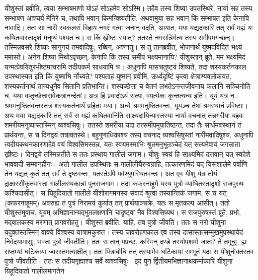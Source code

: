 \vakya यीशुस्तां ब्रवीति, त्वया सम्भाषमाणो योऽहं सोऽहमेव सोऽस्मि।
\vakya तदैव तस्य शिष्या उपतस्थिरे, नार्या सह तस्य सम्भाषण आश्चर्यं मेनिरे च, तथापि भवान् किमन्विष्यतीति, अथवामुया सह भवान् किं सम्भाषत इति केनापि नावादि।
\vakya ततः सा नारी स्वकलसं विहाय नगरं गत्वा जनान् वदति,
\vakya आयात, मया यद्यदकारि तत् सर्वं मह्यं यः कथितवांस्तादृशं मनुष्यं पश्यत च।
\vakya स किं ख्रीष्टः स्यात्? ततस्ते नगरान्निर्गत्य तस्य समीपमगच्छन्।
\vakya तस्मिन्नवसरे शिष्याः सानुनयं तमवादिषुः, रब्बिन्, अश्नातु।
\vakya स तु तानब्रवीत्, भोजनार्थं युष्मदविदितं भक्ष्यं ममास्ते।
\vakya अनेन शिष्या मिथोऽपृच्छन्, केनापि किं तस्य समीपं भक्ष्यमानायि?
\vakya यीशुस्तान् ब्रूते, मम भक्ष्यमिदं यन्मत्प्रेषयितुरभीष्टमाचरामि तदीयकर्म साधयामि च।
\vakya अधुनापि मासचतुष्टयं शिष्यते, तदा शस्यकर्तनकाल उपस्थास्यत इति किं युष्माभि र्नोच्यते? पश्यताहं युष्मान् ब्रवीमि, ऊर्ध्वदृष्टिं कृत्वा क्षेत्राण्यवलोकयत, शस्यकर्तनार्थं तान्यधुनैव सितानि प्रतिभान्ति।
\vakya शस्यच्छेत्ता च वेतनं लभतेऽनन्तजीवनाय फलानि सञ्चिनोति च, यथा वप्तृच्छेत्तारावेकत्रानन्देतां।
\vakya अत्र हि प्रवादोऽयं सत्यः, वपत्येकः कृन्तत्यन्य इति। यूयं यत्र न श्रममनुष्ठितवन्तस्तत्र शस्यकर्तनार्थं प्रहिता मया।
\vakya अन्ये श्रममनुष्ठितवन्तः, यूयञ्च तेषां श्रमस्थानं प्रविष्टाः।
\vakya अथ मया यद्यदकारि तत् सर्वं स मह्यं कथितवानिति साक्ष्यदायिन्यास्तस्या नार्या वचनात् तन्नगरीया बहवः शमरीयमनुष्यास्तस्मिन् व्यश्वसिषुः।
\vakya ततस्ते शमरीया यदा तत्समीपमुपातिष्ठन्त, तदा तैः सार्धमवस्थानं तं प्रार्थयन्त, स च दिनद्वयं तत्रावतस्थे।
\vakya बहुगुणाधिकाश्च तस्य वचनाद् व्यश्वसिषुस्तां नारीमवादिषुश्च,
\vakya अधुनापि त्वदीयकथनकारणादेव वयं विश्वसिमस्तन्न, यतः स्वयमस्माभिः श्रुतमनुभूतञ्चेदं यत् सत्यमेवायं जगत्त्राता ख्रीष्टः।
\vakya दिनद्वये तस्मिन्नतीते स ततः प्रस्थाय गालीलं जगाम।
\vakya यीशुः स्वयं हि साक्ष्यमिदं दत्तवान् यत् स्वदेशे भाववादी सम्मानहीनः।
\vakya अतो गालील उपस्थितः स गालीलीयैरन्वग्राहि, तत्कारणमिदं यद् यिरूशालेमे पर्वाणि तेन यद्यत् कृतं तत् सर्वं ते दृष्टवन्तः, यतस्तेऽपि पर्वण्युपस्थितवन्तः।
\vakya अत एव यीशु र्यत्र तोयं द्राक्षारसीकृतवांस्तां गालीलस्थकान्नां पुनराजगाम। तदा कफरनाहूमे यस्य पुत्रो व्याधितस्तादृशो राजपुरुषः कश्चिदासीत्।
\vakya स यिहूदियातो गालीले यीशोरागमनस्य संवादं श्रुत्वा तस्यान्तिकं जगाम, स च यत् (कफरनाहूमम्) अवरुह्य तं पुत्रं निरामयं कुर्यात् तत् प्रार्थयाञ्चक्रे, यतः स मृतकल्प आसीत्।
\vakya ततो यीशुस्तमुवाच, यूयम् अभिज्ञानान्यद्भुतलक्षणानि चादृष्ट्वा नैव विश्वसिष्यथ।
\vakya स राजपुरुषस्तं ब्रूते, प्रभो, मद्बालकस्य मरणात् प्रागवरोहतु।
\vakya यीशुस्तं ब्रवीति, याहि, तव पुत्रो जीवति। ततः स नरो यीशुना यदुक्तस्तस्मिन् वाक्ये विश्वस्य यात्रामकुरुत।
\vakya तस्य चावरोहणकाल एव तस्य दासास्तत्सम्मुखमुपस्थायेदं निवेदयामासुः, भवतः पुत्रो जीवतीति।
\vakya ततः स तान् पप्रच्छ, कस्मिन् दण्डे तस्योपशमो जातः? ते तमूचुः, ह्यः सप्तम्यां घटिकायां ज्वरस्तमत्याक्षीत्।
\vakya ततः पित्राबोधि तत् तस्यामेव घटिकायां सम्भूतं यदा स यीशुनोक्तस्तव पुत्रो जीवतीति। ततः स तदीयगृह्याश्च सर्वे व्यश्वसिषुः।
\vakya इदं पुन र्द्वितीयमभिज्ञानाथकर्माकारि यीशुना यिहूदियातो गालीलमागतेन\eoc